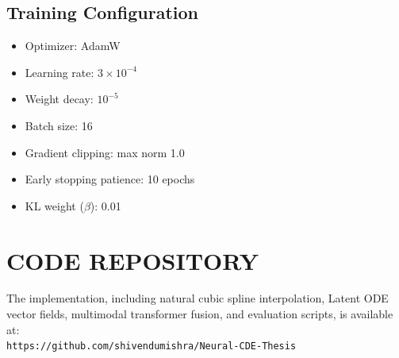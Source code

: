 \documentclass[12pt, a4paper]{report}
\numberwithin{equation}{chapter}
\begin{document}
\section{Training Configuration}
\begin{itemize}
    \setlength{\itemsep}{1pt}
    \setlength{\parskip}{0pt}
    \setlength{\parsep}{0pt}
    \item Optimizer: AdamW
    \item Learning rate: $3 \times 10^{-4}$
    \item Weight decay: $10^{-5}$
    \item Batch size: 16
    \item Gradient clipping: max norm 1.0
    \item Early stopping patience: 10 epochs
    \item KL weight ($\beta$): 0.01
\end{itemize}

\chapter{CODE REPOSITORY}
The implementation, including natural cubic spline interpolation, Latent ODE vector fields, multimodal transformer fusion, and evaluation scripts, is available at: \\ \texttt{https://github.com/shivendumishra/Neural-CDE-Thesis}
\end{document}
